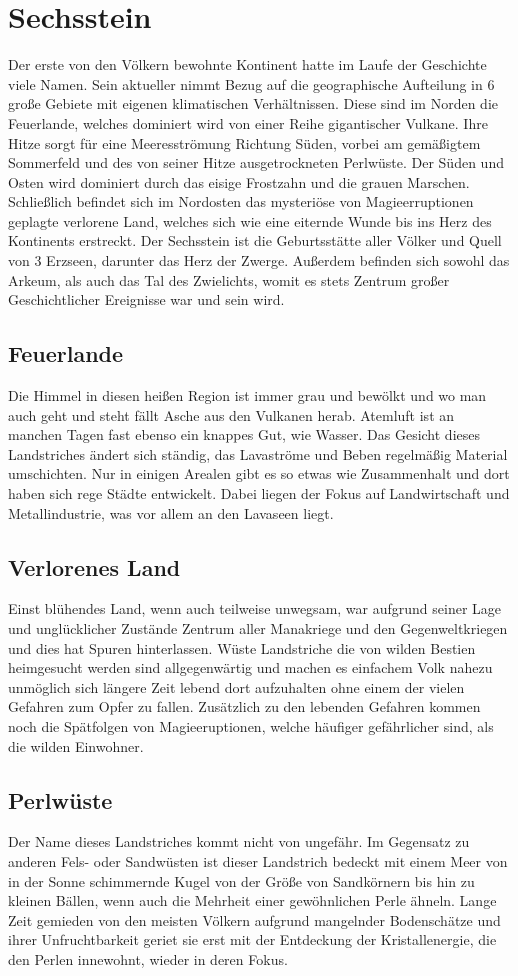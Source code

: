 \documentclass[a4paper,12pt,oneside]{book}
\begin{document}
\chapter{Sechsstein}
Der erste von den Völkern bewohnte Kontinent hatte im Laufe der Geschichte viele Namen. Sein aktueller nimmt Bezug auf die geographische Aufteilung in 6 große Gebiete mit eigenen klimatischen Verhältnissen. Diese sind im Norden die Feuerlande, welches dominiert wird von einer Reihe gigantischer Vulkane. Ihre Hitze sorgt für eine Meeresströmung Richtung Süden, vorbei am gemäßigtem Sommerfeld und des von seiner Hitze ausgetrockneten Perlwüste. Der Süden und Osten wird dominiert durch das eisige Frostzahn und die grauen Marschen. Schließlich befindet sich im Nordosten das mysteriöse von Magieerruptionen geplagte verlorene Land, welches sich wie eine eiternde Wunde bis ins Herz des Kontinents erstreckt. Der Sechsstein ist die Geburtsstätte aller Völker und Quell von 3 Erzseen, darunter das Herz der Zwerge. Außerdem befinden sich sowohl das Arkeum, als auch das Tal des Zwielichts, womit es stets Zentrum großer Geschichtlicher Ereignisse war und sein wird.
\section{Feuerlande}
Die Himmel in diesen heißen Region ist immer grau und bewölkt und wo man auch geht und steht fällt Asche aus den Vulkanen herab. Atemluft ist an manchen Tagen fast ebenso ein knappes Gut, wie Wasser. Das Gesicht dieses Landstriches ändert sich ständig, das Lavaströme und Beben regelmäßig Material umschichten. Nur in einigen Arealen gibt es so etwas wie Zusammenhalt und dort haben sich rege Städte entwickelt. Dabei liegen der Fokus auf Landwirtschaft und Metallindustrie, was vor allem an den Lavaseen liegt.
\section{Verlorenes Land}
Einst blühendes Land, wenn auch teilweise unwegsam, war aufgrund seiner Lage und unglücklicher Zustände Zentrum aller Manakriege und den Gegenweltkriegen und dies hat Spuren hinterlassen. Wüste Landstriche die von wilden Bestien heimgesucht werden sind allgegenwärtig und machen es einfachem Volk nahezu unmöglich sich längere Zeit lebend dort aufzuhalten ohne einem der vielen Gefahren zum Opfer zu fallen. Zusätzlich zu den lebenden Gefahren kommen noch die Spätfolgen von Magieeruptionen, welche häufiger gefährlicher sind, als die wilden Einwohner. 
\section{Perlwüste}
Der Name dieses Landstriches kommt nicht von ungefähr. Im Gegensatz zu anderen Fels- oder Sandwüsten ist dieser Landstrich bedeckt mit einem Meer von in der Sonne schimmernde Kugel von der Größe von Sandkörnern bis hin zu kleinen Bällen, wenn auch die Mehrheit einer gewöhnlichen Perle ähneln. Lange Zeit gemieden von den meisten Völkern aufgrund mangelnder Bodenschätze und ihrer Unfruchtbarkeit geriet sie erst mit der Entdeckung der Kristallenergie, die den Perlen innewohnt, wieder in deren Fokus. 
\end{document}
